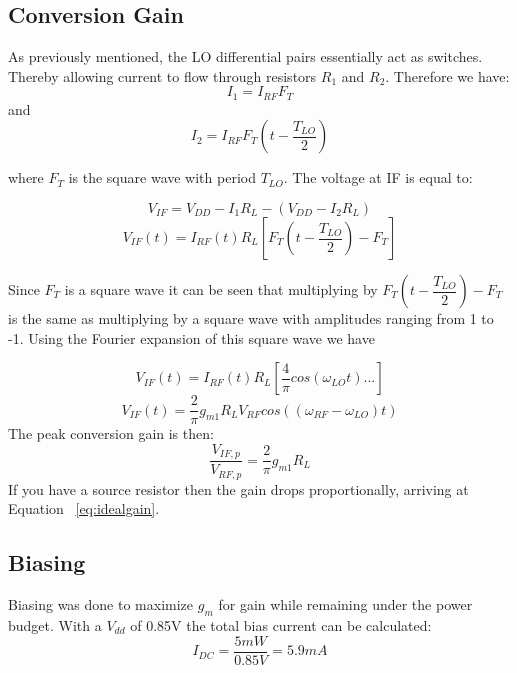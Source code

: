 \documentclass{article}                                                         %
\begin{document}
\subsection{Conversion Gain}
As previously mentioned, the LO differential pairs essentially act as switches. Thereby allowing current to flow through resistors $R_1$
and $R_2$. Therefore we have:
\begin{equation}
  \label{eq:I1}
  I_1 = I_{RF}F_{T}
\end{equation}
and
\begin{equation}
  \label{eq:I2}
  I_2 = I_{RF}F_{T}(t-\dfrac{T_{LO}}{2})
\end{equation}

where $F_{T}$ is the square wave with period $T_{LO}$. The voltage at IF is equal to:

\begin{equation}
  \label{eq:VIF}
  V_{IF} = V_{DD} - I_1R_L - (V_{DD}-I_2R_L)
\end{equation}
\begin{equation}
  \label{eq:VIFt}
  V_{IF}(t) = I_{RF}(t) R_L [F_{T}(t-\dfrac{T_{LO}}{2})-F_{T}]
\end{equation}

\vspace{5mm}Since $F_T$ is a square wave it can be seen that multiplying by $F_{T}(t-\dfrac{T_{LO}}{2})-F_{T}$
is the same as multiplying by a square\vspace{3mm} wave with amplitudes ranging from 1 to -1. Using the Fourier
expansion of this square wave we have

\begin{equation}
  \label{eq:VIFt2}
  V_{IF}(t) = I_{RF}(t)R_L[\dfrac{4}{\pi}cos(\omega_{LO}t)...]
\end{equation}
\begin{equation}
  \label{eq:VIFt3}
  V_{IF}(t) = \dfrac{2}{\pi}g_{m1}R_LV_{RF}cos((\omega_{RF}-\omega_{LO})t)
\end{equation}
The peak conversion gain is then:
\begin{equation}
  \label{eq:Vgain}
  \dfrac{V_{IF,p}}{V_{RF,p}} = \dfrac{2}{\pi}g_{m1}R_L
\end{equation}
\vspace{3mm}If you have a source resistor then the gain drops proportionally, arriving at Equation ~\ref{eq:idealgain}.

\subsection{Biasing}
Biasing was done to maximize $g_m$ for gain while remaining under the power budget. With a $V_{dd}$ of 0.85V
the total bias current can be calculated:
\begin{equation}
  \label{eq:biascurrent}
  I_{DC} = \dfrac{5mW}{0.85V} = 5.9mA
\end{equation}
\end{document}
